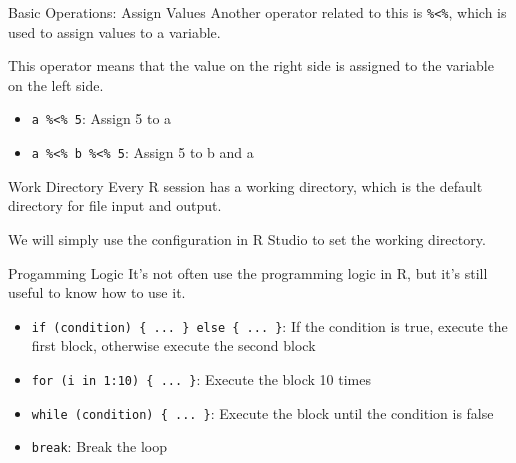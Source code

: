 \documentclass[aspectratio=169]{beamer}
\begin{document}
    \begin{frame}{Basic Operations: Assign Values}
        Another operator related to this is \texttt{\%<\%}, which is used to assign values to a variable.\par
        This operator means that the value on the right side is assigned to the variable on the left side.\par
        \begin{itemize}
            \item \texttt{a \%<\% 5}: Assign 5 to a
            \item \texttt{a \%<\% b \%<\% 5}: Assign 5 to b and a
        \end{itemize}
    \end{frame}

    \begin{frame}{Work Directory}
        Every R session has a working directory, which is the default directory for file input and output.\par
        We will simply use the configuration in R Studio to set the working directory.\par
    \end{frame}

    \begin{frame}{Progamming Logic}
        It's not often use the programming logic in R, but it's still useful to know how to use it.\par
        \begin{itemize}
            \item \texttt{if (condition) \{ ... \} else \{ ... \}}: If the condition is true, execute the first block, otherwise execute the second block
            \item \texttt{for (i in 1:10) \{ ... \}}: Execute the block 10 times
            \item \texttt{while (condition) \{ ... \}}: Execute the block until the condition is false
            \item \texttt{break}: Break the loop
        \end{itemize}
    \end{frame}
\end{document}
